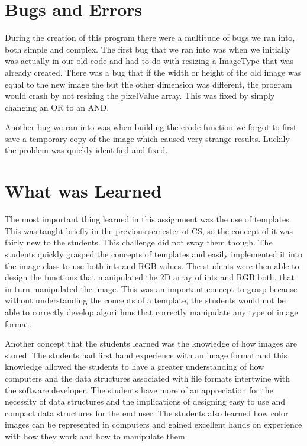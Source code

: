 \documentclass[pdftex, 11pt]{article}
\begin{document}
\section{Bugs and Errors}
	During the creation of this program there were a multitude of bugs we ran into, both simple and complex.  The first
	bug that we ran into was when we initially was actually in our old code and had to do with resizing a ImageType that
	was already created.  There was a bug that if the width or height of the old image was equal to the new image the
	but the other dimension was different, the program would crash by not resizing the pixelValue array.  This was fixed
	by simply changing an OR to an AND.

	Another bug we ran into was when building the erode function we forgot to first save a temporary copy of the image
	which caused very strange results.  Luckily the problem was quickly identified and fixed.

\section{What was Learned}

	The most important thing learned in this assignment was the use of templates. This was taught briefly in the previous
semester of CS, so the concept of it was fairly new to the students. This challenge did not sway them though. The
students quickly grasped the concepts of templates and easily implemented it into the image class to use both ints and
RGB values. The students were then able to design the functions that manipulated the 2D array of ints and RGB both, that
in turn manipulated the image. This was an important concept to grasp because without understanding the concepts of a
template, the students would not be able to correctly develop algorithms that correctly manipulate any type of image
format.

	Another concept that the students learned was the knowledge of how images are stored. The students had first hand
experience with an image format and this knowledge allowed the students to have a greater understanding of how computers
and the data structures associated with file formats intertwine with the software developer. The students have more of
an appreciation for the necessity of data structures and the implications of designing easy to use and compact data
structures for the end user. The students also learned how color images can be represented in computers and gained
excellent hands on experience with how they work and how to manipulate them.
\end{document}
